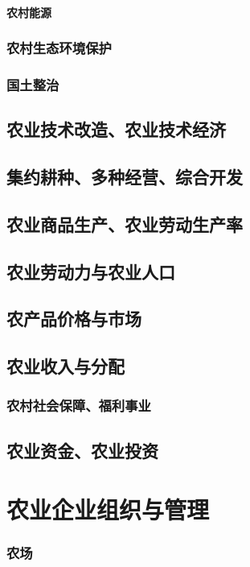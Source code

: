 \documentclass[UTF8]{../../RepresentationUniverse}
\begin{document}
            \paragraph{农村能源}
        \subsubsection{农村生态环境保护}
        \subsubsection{国土整治}
    \subsection{农业技术改造、农业技术经济}
    \subsection{集约耕种、多种经营、综合开发}
    \subsection{农业商品生产、农业劳动生产率}
    \subsection{农业劳动力与农业人口}
    \subsection{农产品价格与市场}
    \subsection{农业收入与分配}
        \subsubsection{农村社会保障、福利事业}
    \subsection{农业资金、农业投资}

\section{农业企业组织与管理}
    \subsubsection{农场}
\end{document}

